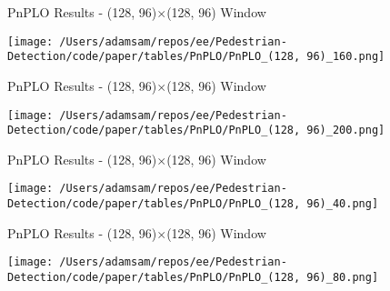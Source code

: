 \begin{table}
    \caption{PnPLO Results - (128, 96)$\times$(128, 96) Window}
    \texttt{[image: /Users/adamsam/repos/ee/Pedestrian-Detection/code/paper/tables/PnPLO/PnPLO\_(128, 96)\_160.png]}
    \label{tab:PnPLO_(128, 96)_160}
\end{table}

\begin{table}
    \caption{PnPLO Results - (128, 96)$\times$(128, 96) Window}
    \texttt{[image: /Users/adamsam/repos/ee/Pedestrian-Detection/code/paper/tables/PnPLO/PnPLO\_(128, 96)\_200.png]}
    \label{tab:PnPLO_(128, 96)_200}
\end{table}

\begin{table}
    \caption{PnPLO Results - (128, 96)$\times$(128, 96) Window}
    \texttt{[image: /Users/adamsam/repos/ee/Pedestrian-Detection/code/paper/tables/PnPLO/PnPLO\_(128, 96)\_40.png]}
    \label{tab:PnPLO_(128, 96)_40}
\end{table}

\begin{table}
    \caption{PnPLO Results - (128, 96)$\times$(128, 96) Window}
    \texttt{[image: /Users/adamsam/repos/ee/Pedestrian-Detection/code/paper/tables/PnPLO/PnPLO\_(128, 96)\_80.png]}
    \label{tab:PnPLO_(128, 96)_80}
\end{table}
